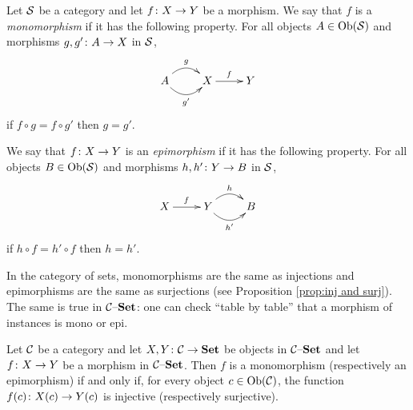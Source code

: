 \documentclass[CT4S-EN-RU]{subfiles}
\begin{document}
\begin{blockRUS}
\end{blockRUS}

\begin{definitionENG}\label{def:mono, epi}
Let $\mathcal{S}$ be a category and let $f\colon X\rightarrow Y$ be a morphism. We say that $f$ is a {\em monomorphism} if it has the following property. For all objects $A\in\textnormal{Ob}(\mathcal{S})$ and morphisms $g,g'\colon A\rightarrow X$ in $\mathcal{S}$, 
$$
\xymatrix{A\ar@/^1pc/[r]^g\ar@/_1pc/[r]_{g'}&X\ar[r]^f&Y}
$$
if $f\circ g=f\circ g'$ then $g=g'$.

We say that $f\colon X\rightarrow Y$ is an {\em epimorphism} if it has the following property. For all objects $B\in\textnormal{Ob}(\mathcal{S})$ and morphisms $h,h'\colon Y\rightarrow B$ in $\mathcal{S}$,
$$
\xymatrix{X\ar[r]^f&Y\ar@/^1pc/[r]^h\ar@/_1pc/[r]_{h'}&B}
$$
if $h\circ f=h'\circ f$ then $h=h'$.
\end{definitionENG}

\begin{definitionRUS}\label{def:mono, epi}
\end{definitionRUS}

\begin{blockENG}
In the category of sets, monomorphisms are the same as injections and epimorphisms are the same as surjections (see Proposition \ref{prop:inj and surj}). The same is true in $\mathcal{C}{\text \textendash}{\bf Set}$: one can check “table by table” that a morphism of instances is mono or epi.
\end{blockENG}

\begin{blockRUS}
\end{blockRUS}

\begin{propositionENG}\label{prop:epi mono in c-set}
Let $\mathcal{C}$ be a category and let $X,Y\colon\mathcal{C}\rightarrow{\bf Set}$ be objects in $\mathcal{C}{\text \textendash}{\bf Set}$ and let $f\colon X\rightarrow Y$ be a morphism in $\mathcal{C}{\text \textendash}{\bf Set}$. Then $f$ is a monomorphism (respectively an epimorphism) if and only if, for every object $c\in\textnormal{Ob}(\mathcal{C})$, the function $f(c)\colon X(c)\rightarrow Y(c)$ is injective (respectively surjective). 
\end{propositionENG}

\begin{propositionRUS}\label{prop:epi mono in c-set}
\end{propositionRUS}
\end{document}
